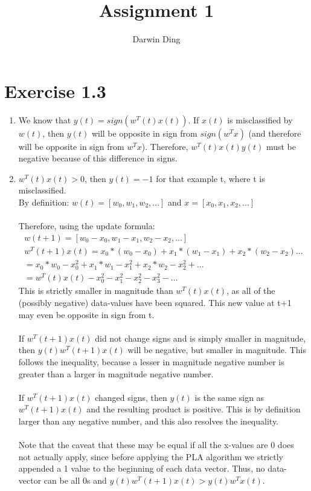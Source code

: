 \documentclass[12pt]{article}
\begin{document}
\title{Assignment 1}
\author{Darwin Ding}
\maketitle

\section*{Exercise 1.3}
\begin{enumerate}[label=(\alph*)]
	\item We know that $y(t) = sign(w^T(t) x(t))$. If $x(t)$ is misclassified by $w(t)$, then $y(t)$ will be opposite in sign from $sign(w^T x)$ (and therefore will be opposite in sign from $w^T x$). Therefore, $w^T(t) x(t) y(t)$ must be negative because of this difference in signs.
	\item $w^T(t) x(t) > 0$, then $y(t) = -1$ for that example t, where t is misclassified. \\ By definition: $w(t) = [w_0, w_1, w_2, ...]$ and $x = [x_0, x_1, x_2, ...]$
	\\
	\\ Therefore, using the update formula: 
	\begin{gather*}
		w(t+1) = [w_0 - x_0, w_1 - x_1, w_2 - x_2, ...]
		\\ w^T(t+1) x(t) = x_0 * (w_0 - x_0) + x_1 * (w_1 - x_1) + x_2 * (w_2 - x_2)... 
		\\ = x_0 * w_0 - x_0^2 + x_1 * w_1 - x_1^2 + x_2 * w_2 - x_2^2 + ... 
		\\ = w^T(t) x(t) - x_0^2 - x_1^2 - x_2^2 - x_3^2 - ...
	\end{gather*}
	This is strictly smaller in magnitude than $w^T(t)x(t)$, as all of the (possibly negative) data-values have been squared. This new value at t+1 may even be opposite in sign from t.
	\\ \\ If $w^T(t+1) x(t)$ did not change signs and is simply smaller in magnitude, then $y(t) w^T(t+1) x(t)$ will be negative, but smaller in magnitude. This follows the inequality, because a lesser in magnitude negative number is greater than a larger in magnitude negative number.
	\\ \\ If $w^T(t+1) x(t)$ changed signs, then $y(t)$ is the same sign as $w^T(t+1) x(t)$ and the resulting product is positive. This is by definition larger than any negative number, and this also resolves the inequality.
	\\ \\ Note that the caveat that these may be equal if all the x-values are 0 does not actually apply, since before applying the PLA algorithm we strictly appended a 1 value to the beginning of each data vector. Thus, no data-vector can be all 0s and $y(t)w^T(t+1)x(t) > y(t)w^Tx(t)$.

\end{enumerate}
\end{document}
